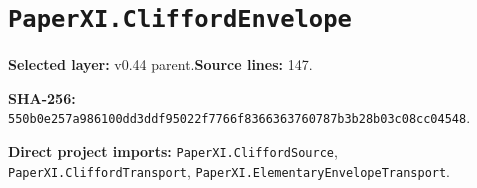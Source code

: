 \documentclass[10pt,oneside]{book}
\begin{document}
\section{\texorpdfstring{\nolinkurl{PaperXI.CliffordEnvelope}}{PaperXI.CliffordEnvelope}}\label{module:PaperXI.CliffordEnvelope}

\textbf{Selected layer:} v0.44 parent.\quad\textbf{Source lines:} 147.\par\textbf{SHA-256:} {\scriptsize\nolinkurl{550b0e257a986100dd3ddf95022f7766f8366363760787b3b28b03c08cc04548}}.


\textbf{Direct project imports:} \nolinkurl{PaperXI.CliffordSource}, \nolinkurl{PaperXI.CliffordTransport}, \nolinkurl{PaperXI.ElementaryEnvelopeTransport}.
\end{document}
